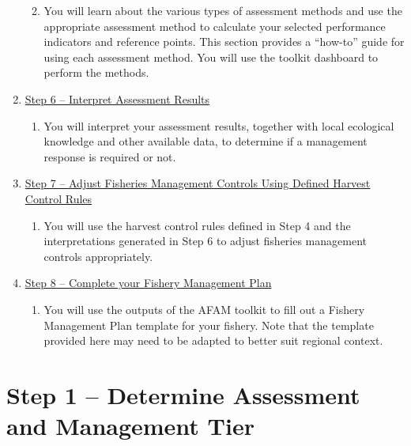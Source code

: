 \documentclass[]{book}
\providecommand{\tightlist}{%
  \setlength{\itemsep}{0pt}\setlength{\parskip}{0pt}}
\begin{document}
\begin{enumerate}
  \begin{enumerate}
  \def\labelenumii{\alph{enumii}.}
  \tightlist
  \item
    You will learn about the various types of assessment methods and use
    the appropriate assessment method to calculate your selected
    performance indicators and reference points. This section provides a
    ``how-to'' guide for using each assessment method. You will use the
    toolkit dashboard to perform the methods.
  \end{enumerate}
\item
  \protect\hyperlink{Step6}{Step 6 -- Interpret Assessment Results}

  \begin{enumerate}
  \def\labelenumii{\alph{enumii}.}
  \tightlist
  \item
    You will interpret your assessment results, together with local
    ecological knowledge and other available data, to determine if a
    management response is required or not.
  \end{enumerate}
\item
  \protect\hyperlink{Step7}{Step 7 -- Adjust Fisheries Management
  Controls Using Defined Harvest Control Rules}

  \begin{enumerate}
  \def\labelenumii{\alph{enumii}.}
  \tightlist
  \item
    You will use the harvest control rules defined in Step 4 and the
    interpretations generated in Step 6 to adjust fisheries management
    controls appropriately.
  \end{enumerate}
\item
  \protect\hyperlink{Step8}{Step 8 -- Complete your Fishery Management
  Plan}

  \begin{enumerate}
  \def\labelenumii{\alph{enumii}.}
  \tightlist
  \item
    You will use the outputs of the AFAM toolkit to fill out a Fishery
    Management Plan template for your fishery. Note that the template
    provided here may need to be adapted to better suit regional
    context.
  \end{enumerate}
\end{enumerate}

\hypertarget{Step1}{\chapter{Step 1 -- Determine Assessment and
Management Tier}\label{Step1}}
\end{document}
